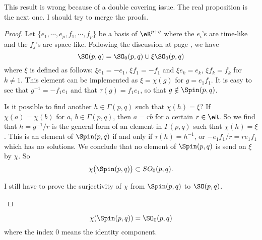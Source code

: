 \begin{probleme}
	This result is wrong because of a double covering issue. The real proposition is the next one. I should try to merge the proofs.
\end{probleme}

\begin{proof}
Let $\{ e_1,\cdots,e_p,f_1,\cdots,f_p \}$ be a basis of $\eR^{p+q}$ where the $e_i$'s are time-like and the $f_j$'s are space-like.
Following the discussion at page \pageref{PgDisGeoConnSO}, we have
\[
  \SO(p,q)=\SO_0(p,q)\cup\xi \SO_0(p,q)
\]
where $\xi$ is defined as follows: $\xi e_1=-e_1$, $\xi f_1=-f_1$ and $\xi e_k=e_k$, $\xi f_k=f_k$ for $k\neq 1$. This element can be implemented as $\xi=\chi(g)$ for $g=e_1f_1$. It is easy to see that $g^{-1}=-f_1e_1$ and that $\tau(g)=f_1e_1$, so that $g\notin\Spin(p,q)$.

Is it possible to find another $h\in\Gamma(p,q)$ such that $\chi(h)=\xi$? If $\chi(a)=\chi(b)$ for $a$, $b\in\Gamma(p,q)$, then $a=rb$ for a certain $r\in\eR$. So we find that $h=g^{-1}/r$ is the general form of an element in $\Gamma(p,q)$ such that $\chi(h)=\xi$. This is an element of $\Spin(p,q)$ if and only if $\tau(h)=h^{-1}$, or $-e_1f_1/r=re_1f_1$ which has no solutions. We conclude that no element of $\Spin(p,q)$ is send on $\xi$ by $\chi$. So
\[
  \chi\big( \Spin(p,q) \big)\subset SO_0(p,q).
\]

\begin{probleme}
	I still have to prove the surjectivity of $\chi$ from $\Spin(p,q)$ to $\SO(p,q)$.
\end{probleme}

\end{proof}
\begin{theorem}
\begin{equation}	\label{EqchiSpinSO}
             \chi(\Spin(p,q))=\SO_0(p,q)
\end{equation}
where the index $0$ means the identity component.
\end{theorem}

